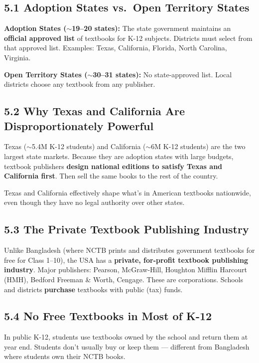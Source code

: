 	\subsection{5.1 Adoption States vs.\ Open Territory States}

	\textbf{Adoption States ($\sim$19--20 states):} The state government maintains an \textbf{official approved list} of textbooks for K-12 subjects. Districts must select from that approved list. Examples: Texas, California, Florida, North Carolina, Virginia.

	\textbf{Open Territory States ($\sim$30--31 states):} No state-approved list. Local districts choose any textbook from any publisher.

	\subsection{5.2 Why Texas and California Are Disproportionately Powerful}

	Texas ($\sim$5.4M K-12 students) and California ($\sim$6M K-12 students) are the two largest state markets. Because they are adoption states with large budgets, textbook publishers \textbf{design national editions to satisfy Texas and California first}. Then sell the same books to the rest of the country.

	Texas and California effectively shape what's in American textbooks nationwide, even though they have no legal authority over other states.

	\subsection{5.3 The Private Textbook Publishing Industry}

	Unlike Bangladesh (where NCTB prints and distributes government textbooks for free for Class 1--10), the USA has a \textbf{private, for-profit textbook publishing industry}. Major publishers: Pearson, McGraw-Hill, Houghton Mifflin Harcourt (HMH), Bedford Freeman \& Worth, Cengage. These are corporations. Schools and districts \textbf{purchase} textbooks with public (tax) funds.

	\subsection{5.4 No Free Textbooks in Most of K-12}

	In public K-12, students use textbooks owned by the school and return them at year end. Students don't usually buy or keep them --- different from Bangladesh where students own their NCTB books.


